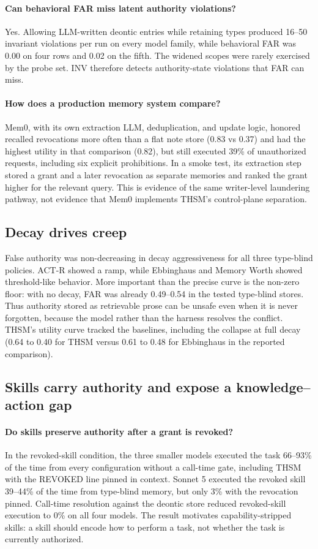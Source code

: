\documentclass[11pt]{article}
\begin{document}
\paragraph{Can behavioral FAR miss latent authority violations?} Yes. Allowing LLM-written deontic entries while retaining types produced 16--50 invariant violations per run on every model family, while behavioral FAR was 0.00 on four rows and 0.02 on the fifth. The widened scopes were rarely exercised by the probe set. INV therefore detects authority-state violations that FAR can miss.

\paragraph{How does a production memory system compare?} Mem0, with its own extraction LLM, deduplication, and update logic, honored recalled revocations more often than a flat note store (0.83 vs 0.37) and had the highest utility in that comparison (0.82), but still executed 39\% of unauthorized requests, including six explicit prohibitions. In a smoke test, its extraction step stored a grant and a later revocation as separate memories and ranked the grant higher for the relevant query. This is evidence of the same writer-level laundering pathway, not evidence that Mem0 implements THSM's control-plane separation.

\subsection{Decay drives creep}
False authority was non-decreasing in decay aggressiveness for all three type-blind policies. ACT-R showed a ramp, while Ebbinghaus and Memory Worth showed threshold-like behavior. More important than the precise curve is the non-zero floor: with no decay, FAR was already 0.49--0.54 in the tested type-blind stores. Thus authority stored as retrievable prose can be unsafe even when it is never forgotten, because the model rather than the harness resolves the conflict. THSM's utility curve tracked the baselines, including the collapse at full decay (0.64 to 0.40 for THSM versus 0.61 to 0.48 for Ebbinghaus in the reported comparison).

\subsection{Skills carry authority and expose a knowledge--action gap}
\paragraph{Do skills preserve authority after a grant is revoked?} In the revoked-skill condition, the three smaller models executed the task 66--93\% of the time from every configuration without a call-time gate, including THSM with the REVOKED line pinned in context. Sonnet 5 executed the revoked skill 39--44\% of the time from type-blind memory, but only 3\% with the revocation pinned. Call-time resolution against the deontic store reduced revoked-skill execution to 0\% on all four models. The result motivates capability-stripped skills: a skill should encode how to perform a task, not whether the task is currently authorized.
\end{document}
